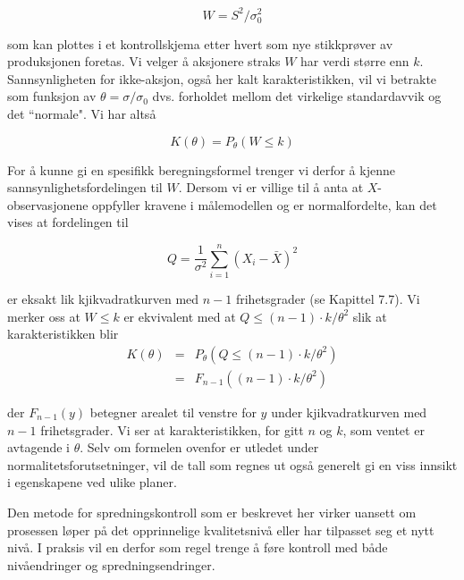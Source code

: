 \[   W=S^2/{\sigma}_0^2     \]

\noindent som kan plottes i et kontrollskjema etter hvert som nye
stikkprøver av produksjonen foretas.  Vi velger å aksjonere
straks $W$ har verdi større enn $k$.  Sannsynligheten for ikke-aksjon,
også her kalt karakteristikken, vil vi betrakte som funksjon av
$\theta = {\sigma}/{\sigma}_0$ dvs. forholdet mellom det virkelige
standardavvik og det ``normale".  Vi har altså

\[   K(\theta )=P_{\theta}(W\leq k)   \]

\noindent For å kunne gi en spesifikk beregningsformel trenger vi derfor
å kjenne sannsynlighetsfordelingen til $W$.  Dersom vi er villige til å
anta at $X$-observasjonene oppfyller kravene i målemodellen og er
normalfordelte, kan det vises at fordelingen til

\[  Q=\frac{1}{\sigma^2}\sum_{i=1}^n{(X_i-\bar{X})}^2 \]

\noindent er eksakt lik kjikvadratkurven med $n-1$ frihetsgrader (se Kapittel
7.7).  Vi merker oss at $W\leq k$ er ekvivalent med at 
$Q\leq (n-1)\cdot k/{\theta}^2$ slik at karakteristikken blir
\begin{eqnarray*}
K(\theta )&=&P_{\theta}(Q\leq (n-1)\cdot k/{\theta}^2)\\
          &=&F_{n-1}((n-1)\cdot k/{\theta}^2)
\end{eqnarray*}

\noindent der $F_{n-1}(y)$ betegner arealet til venstre for $y$ under 
kjikvadratkurven med $n-1$ frihetsgrader.  Vi ser at karakteristikken,
for gitt $n$ og $k$, som ventet er avtagende i $\theta$.  Selv om
formelen ovenfor er utledet under normalitetsforutsetninger, vil
de tall som regnes ut også generelt gi en viss innsikt i egenskapene
ved ulike planer.

Den metode for spredningskontroll som er beskrevet her virker uansett
om prosessen løper på det opprinnelige kvalitetsnivå eller
har tilpasset seg et nytt nivå.  I praksis vil en derfor som regel
trenge å føre kontroll med både nivåendringer og
spredningsendringer. \\

